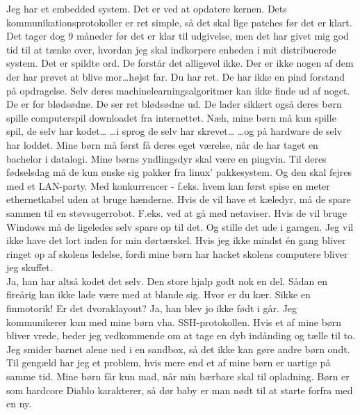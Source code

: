 \documentclass[a4paper,11pt]{article}
\begin{document}
\begin{sketch}
 Jeg har et embedded system. Det er ved at opdatere kernen. Dets
kommunikationsprotokoller er ret simple, så det skal lige patches før
det er klart. Det tager dog 9 måneder før det er klar til udgivelse,
men det har givet mig god tid til at tænke over, hvordan jeg skal
indkorpere enheden i mit distribuerede system.
 Det er spildte ord. De forstår det alligevel ikke. Der er ikke
nogen af dem der har prøvet at blive mor\ldots højst far.
 Du har ret. De har ikke en pind forstand på opdragelse. Selv deres
machinelearningsalgoritmer kan ikke finde ud af noget.
 De er for blødsødne.
 De ser ret blødsødne ud.
 De lader sikkert også deres børn spille computerspil downloadet
fra internettet.
 Næh, mine børn må kun spille spil, de selv har kodet\ldots
{} \ldots i sprog de selv har skrevet\ldots
{} \ldots og på hardware de selv har loddet.
 Mine børn må først få deres eget værelse, når de har taget en
bachelor i datalogi.
 Mine børns yndlingsdyr skal være en pingvin. Til deres fødselsdag
må de kun ønske sig pakker fra linux' pakkesystem.
 Og den skal fejres med et LAN-party. Med konkurrencer - f.eks.
hvem kan først spise en meter ethernetkabel uden at bruge hænderne.
 Hvis de vil have et kæledyr, må de spare sammen til en
støvsugerrobot. F.eks. ved at gå med netaviser.
 Hvis de vil bruge Windows må de ligeledes selv spare op til det.
Og stille det ude i garagen. Jeg vil ikke have det lort inden for min
dørtærskel.
 Hvis jeg ikke mindst én gang bliver ringet op af skolens ledelse,
fordi mine børn har hacket skolens computere bliver jeg skuffet.
 \\
 Ja, han har altså kodet det selv. Den store hjalp godt nok en del.
Sådan en fireårig kan ikke lade være med at blande sig.
 Hvor er du kær.
 Sikke en finmotorik! Er det dvoraklayout?
 Ja, han blev jo ikke født i går.
  Jeg kommunikerer kun med mine børn vha. SSH-protokollen.
 Hvis et af mine børn bliver vrede, beder jeg vedkommende om at
tage en dyb indånding og tælle til to.
 Jeg smider barnet alene ned i en sandbox, så det ikke kan gøre
andre børn ondt. Til gengæld har jeg et problem, hvis mere end et af
mine børn er uartige på samme tid.
 Mine børn får kun mad, når min bærbare skal til opladning.
 Børn er som hardcore Diablo karakterer, så dør baby er man nødt
til at starte forfra med en ny. 


\end{sketch}
\end{document}
